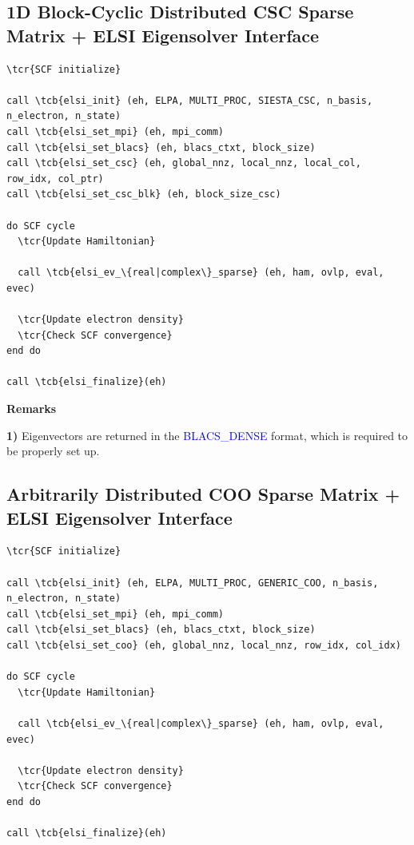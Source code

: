 \documentclass{report}
\newcommand{\tcb}[1]{\textcolor{blue}{#1}}
\newcommand{\tcr}[1]{\textcolor{red}{#1}}
\begin{document}
\subsection*{1D Block-Cyclic Distributed CSC Sparse Matrix + ELSI Eigensolver Interface}
\begin{tcolorbox}
\begin{Verbatim}[commandchars=\\\{\}]
\tcr{SCF initialize}

call \tcb{elsi_init} (eh, ELPA, MULTI_PROC, SIESTA_CSC, n_basis, n_electron, n_state)
call \tcb{elsi_set_mpi} (eh, mpi_comm)
call \tcb{elsi_set_blacs} (eh, blacs_ctxt, block_size)
call \tcb{elsi_set_csc} (eh, global_nnz, local_nnz, local_col, row_idx, col_ptr)
call \tcb{elsi_set_csc_blk} (eh, block_size_csc)

do SCF cycle
  \tcr{Update Hamiltonian}

  call \tcb{elsi_ev_\{real|complex\}_sparse} (eh, ham, ovlp, eval, evec)

  \tcr{Update electron density}
  \tcr{Check SCF convergence}
end do

call \tcb{elsi_finalize}(eh)
\end{Verbatim}
\end{tcolorbox}

\textbf{Remarks}

\textbf{1)} Eigenvectors are returned in the \tcb{BLACS\_DENSE} format, which is required to be properly set up.

\subsection*{Arbitrarily Distributed COO Sparse Matrix + ELSI Eigensolver Interface}
\begin{tcolorbox}
\begin{Verbatim}[commandchars=\\\{\}]
\tcr{SCF initialize}

call \tcb{elsi_init} (eh, ELPA, MULTI_PROC, GENERIC_COO, n_basis, n_electron, n_state)
call \tcb{elsi_set_mpi} (eh, mpi_comm)
call \tcb{elsi_set_blacs} (eh, blacs_ctxt, block_size)
call \tcb{elsi_set_coo} (eh, global_nnz, local_nnz, row_idx, col_idx)

do SCF cycle
  \tcr{Update Hamiltonian}

  call \tcb{elsi_ev_\{real|complex\}_sparse} (eh, ham, ovlp, eval, evec)

  \tcr{Update electron density}
  \tcr{Check SCF convergence}
end do

call \tcb{elsi_finalize}(eh)
\end{Verbatim}
\end{tcolorbox}
\end{document}
